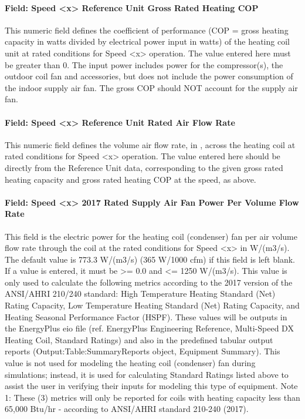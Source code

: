 \paragraph{Field: Speed \textless{}x\textgreater{} Reference Unit Gross Rated Heating COP}\label{field-speed-x-reference-unit-gross-rated-heating-cop}

This numeric field defines the coefficient of performance (COP = gross heating capacity in watts divided by electrical power input in watts) of the heating coil unit at rated conditions for Speed \textless{}x\textgreater{} operation. The value entered here must be greater than 0. The input power includes power for the compressor(s), the outdoor coil fan and accessories, but does not include the power consumption of the indoor supply air fan. The gross COP should NOT account for the supply air fan.

\paragraph{Field: Speed \textless{}x\textgreater{} Reference Unit Rated Air Flow Rate}\label{field-speed-x-reference-unit-rated-air-flow-rate-1}

This numeric field defines the volume air flow rate, in \si{\volumeFlowRate}, across the heating coil at rated conditions for Speed \textless{}x\textgreater{} operation. The value entered here should be directly from the Reference Unit data, corresponding to the given gross rated heating capacity and gross rated heating COP at the speed, as above.

\paragraph{Field: Speed \textless{}x\textgreater{} 2017 Rated Supply Air Fan Power Per Volume Flow Rate}

This field is the electric power for the heating coil (condenser) fan per air volume flow rate through the coil at the rated conditions for Speed \textless{}x\textgreater{} in W/(m3/s). The default value is 773.3 W/(m3/s) (365 W/1000 cfm) if this field is left blank. If a value is entered, it must be \textgreater{}= 0.0 and \textless{}= 1250 W/(m3/s). This value is only used to calculate the following metrics according to the 2017 version of the ANSI/AHRI 210/240 standard: High Temperature Heating Standard (Net) Rating Capacity, Low Temperature Heating Standard (Net) Rating Capacity, and Heating Seasonal Performance Factor (HSPF). These values will be outputs in the EnergyPlus eio file (ref. EnergyPlus Engineering Reference, Multi-Speed DX Heating Coil, Standard Ratings) and also in the predefined tabular output reports (Output:Table:SummaryReports object, Equipment Summary). This value is not used for modeling the heating coil (condenser) fan during simulations; instead, it is used for calculating Standard Ratings listed above to assist the user in verifying their inputs for modeling this type of equipment.
Note 1: These (3) metrics will only be reported for coils with heating capacity less than 65,000 Btu/hr - according to ANSI/AHRI standard 210-240 (2017).

